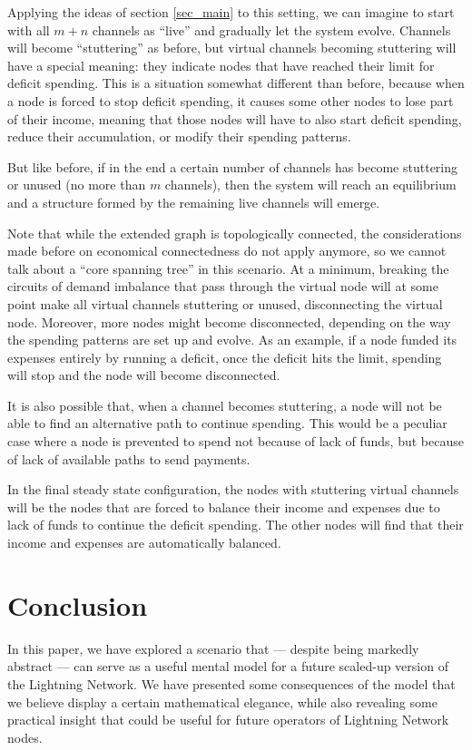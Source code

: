 \documentclass[a4paper]{article}
\begin{document}
Applying the ideas of section \ref{sec_main} to this setting, we can imagine to start with all $m+n$ channels as ``live'' and gradually let the system evolve. Channels will become ``stuttering'' as before, but virtual channels becoming stuttering will have a special meaning: they indicate nodes that have reached their limit for deficit spending. This is a situation somewhat different than before, because when a node is forced to stop deficit spending, it causes some other nodes to lose part of their income, meaning that those nodes will have to also start deficit spending, reduce their accumulation, or modify their spending patterns.

But like before, if in the end a certain number of channels has become stuttering or unused (no more than $m$ channels), then the system will reach an equilibrium and a structure formed by the remaining live channels will emerge.

Note that while the extended graph is topologically connected, the considerations made before on economical connectedness do not apply anymore, so we cannot talk about a ``core spanning tree'' in this scenario. At a minimum, breaking the circuits of demand imbalance that pass through the virtual node will at some point make all virtual channels stuttering or unused, disconnecting the virtual node. Moreover, more nodes might become disconnected, depending on the way the spending patterns are set up and evolve. As an example, if a node funded its expenses entirely by running a deficit, once the deficit hits the limit, spending will stop and the node will become disconnected.

It is also possible that, when a channel becomes stuttering, a node will not be able to find an alternative path to continue spending. This would be a peculiar case where a node is prevented to spend not because of lack of funds, but because of lack of available paths to send payments.

In the final steady state configuration, the nodes with stuttering virtual channels will be the nodes that are forced to balance their income and expenses due to lack of funds to continue the deficit spending. The other nodes will find that their income and expenses are automatically balanced.

\section{Conclusion}\label{sec_conclusion}

In this paper, we have explored a scenario that --- despite being markedly abstract --- can serve as a useful mental model for a future scaled-up version of the Lightning Network. We have presented some consequences of the model that we believe display a certain mathematical elegance, while also revealing some practical insight that could be useful for future operators of Lightning Network nodes.
\end{document}
